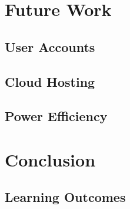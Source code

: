 \documentclass[12pt]{report}
\begin{document}
\chapter{Future Work}
\section{User Accounts}
\section{Cloud Hosting}
\section{Power Efficiency}

\chapter{Conclusion}
\section{Learning Outcomes}
\end{document}

